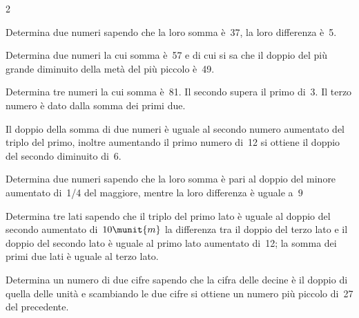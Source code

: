 \begin{htmulticols}{2}
\begin{esercizio}
 \label{ese:22.77}
Determina due numeri sapendo che la loro somma è~37, la loro
differenza è~5.
\end{esercizio}

\begin{esercizio}[]
 \label{ese:22.81}
Determina due numeri la cui somma è~57 e di cui si sa che il doppio del più 
grande diminuito della metà del più piccolo è~49.
\end{esercizio}

\begin{esercizio}[*]
 \label{ese:22.79}
Determina tre numeri la cui somma è~81. Il secondo supera il primo
di~3. Il terzo numero è dato dalla somma dei primi due. 
\end{esercizio}

\begin{esercizio}[*]
 \label{ese:22.78}
Il doppio della somma di due numeri è uguale al secondo numero aumentato
del triplo del primo, inoltre aumentando il primo numero di~12 si
ottiene il doppio del secondo diminuito di~6. 
\end{esercizio}

\begin{esercizio}[*]
 \label{ese:22.80}
Determina due numeri sapendo che la loro somma è pari al doppio del minore 
aumentato di~1/4
del maggiore, mentre la loro differenza è uguale a~\(9\)
\end{esercizio}

\begin{esercizio}[*]
 \label{ese:22.82}
Determina tre lati sapendo che il triplo del primo lato è
uguale al doppio del secondo aumentato di~\(10\munit{m}\) la differenza 
tra il doppio del terzo lato e il doppio del secondo lato è uguale al 
primo lato aumentato di~12; la somma dei primi due lati è uguale al terzo
lato.
\end{esercizio}

\begin{esercizio}[*]
 \label{ese:22.83}
Determina un numero di due cifre sapendo che la cifra delle decine
è il doppio di quella delle unità e scambiando le due cifre si
ottiene un numero più piccolo di~27 del precedente.
\end{esercizio}


\end{htmulticols}
